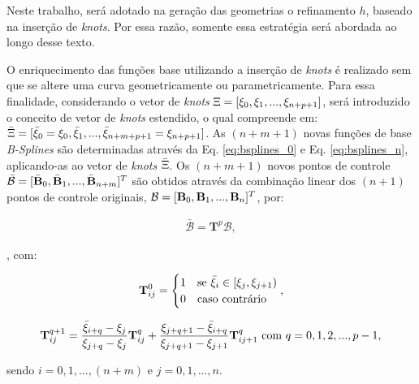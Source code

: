 \documentclass[tese_patricia]{subfiles}
\begin{document}
Neste trabalho, será adotado na geração das geometrias o refinamento $h$, baseado na inserção de \textit{knots}. Por essa razão, somente essa estratégia será abordada ao longo desse texto.

O enriquecimento das funções base utilizando a inserção de \textit{knots} é realizado sem que se altere uma curva geometricamente ou parametricamente. Para essa finalidade, considerando o vetor de \textit{knots} $\Xi = [\xi_0,\xi_1, ..., \xi_{n+p+1}]$, será introduzido o conceito de vetor de \textit{knots} estendido, o qual compreende em: $\bar{\Xi} = [\bar{\xi}_0 = \xi_0,\bar{\xi}_1, ..., \bar{\xi}_{n+m+p+1}= \xi_{n+p+1}]$. As $(n+m+1)$ novas funções de base \textit{B-Splines} são determinadas através da Eq. \ref{eq:bsplines_0} e Eq. \ref{eq:bsplines_n}, aplicando-as ao vetor de \textit{knots} $\bar{\Xi}$. Os $(n+m+1)$ novos pontos de controle  $\bar{\mathcal{B}} = [\bar{\mathbf{B}}_0,\bar{\mathbf{B}}_1,..., \bar{\mathbf{B}}_{n+m}]^{T}$ são obtidos através da combinação linear dos $(n+1)$ pontos de controle originais, $\mathcal{B} = [\mathbf{B}_0,\mathbf{B}_1,..., \mathbf{B}_{n}]^{T}$, por:


\begin{align}
	\bar{\mathcal{B}} = \mathbf{T}^{p}\mathcal{B},
\end{align}

\noindent, com:

\begin{align}
	\mathbf{T}_{ij}^{0} = \begin{cases} 1 &\mbox{se } \bar{\xi}_i \in \left[\xi_j,\xi_{j+1}\right) \\
		0 & \mbox{caso contrário } \end{cases}, 
\end{align}

\begin{align}
	\mathbf{T}_{ij}^{q+1} = \frac{\bar{\xi}_{i+q}-\xi_j}{\xi_{j+q}-\xi_j}\mathbf{T}_{ij}^{q} + \frac{\xi_{j+q+1}-\bar{\xi}_{i+q}}{\xi_{j+q+1}-\xi_{j+1}}\mathbf{T}_{ij+1}^{q} \ \text{com} \ q=0,1,2,...,p-1,
\end{align}

\noindent sendo $i=0,1,...,(n+m)$ e $j=0,1,...,n$.
\end{document}
